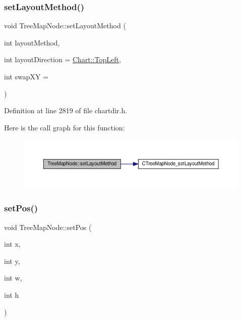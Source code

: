 \subsubsection{\texorpdfstring{set\+Layout\+Method()}{setLayoutMethod()}}
{\footnotesize\ttfamily void Tree\+Map\+Node\+::set\+Layout\+Method (\begin{DoxyParamCaption}\item[{int}]{layout\+Method,  }\item[{int}]{layout\+Direction = {\ttfamily \hyperlink{namespace_chart_ae222e51ce11a254450b6ddfbc862680aa0bf92d1d2d6713aa62e92b86b9a8532f}{Chart\+::\+Top\+Left}},  }\item[{int}]{swap\+XY = {} }\end{DoxyParamCaption})\hspace{0.3cm}{\ttfamily [inline]}}



Definition at line 2819 of file chartdir.\+h.

Here is the call graph for this function\+:
\nopagebreak
\begin{figure}[H]
\begin{center}
\leavevmode
\includegraphics[width=350pt]{class_tree_map_node_a658ae0fc093692e501c1d6a4a18c7c74_cgraph}
\end{center}
\end{figure}
\mbox{\label{class_tree_map_node_a739d1874f5c0496388eeeb9bd4849f49}} 
\subsubsection{\texorpdfstring{set\+Pos()}{setPos()}}
{\footnotesize\ttfamily void Tree\+Map\+Node\+::set\+Pos (\begin{DoxyParamCaption}\item[{int}]{x,  }\item[{int}]{y,  }\item[{int}]{w,  }\item[{int}]{h }\end{DoxyParamCaption})\hspace{0.3cm}{\ttfamily [inline]}}



